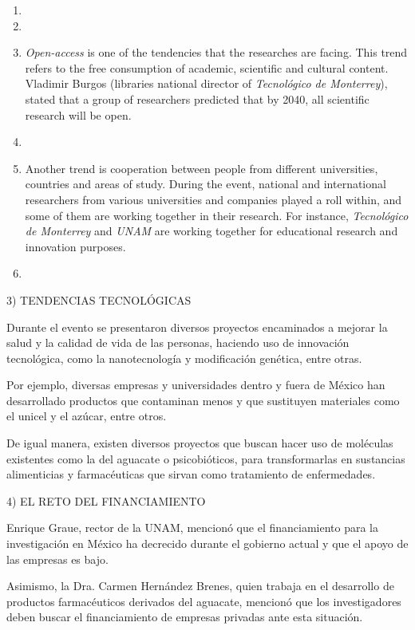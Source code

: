\documentclass[11pt,a4paper]{article}
\begin{document}
\begin{enumerate}
	\item{
		
	}
	\item{
		
	}
	\item{
		\emph{Open-access} is one of the tendencies that the researches are facing. This trend refers to the free consumption of academic, scientific and cultural content. Vladimir Burgos (libraries national director of \emph{Tecnológico de Monterrey}), stated that a group of researchers predicted that by 2040, all scientific research will be open.
	}
	\item{
		
	}
	\item{
		Another trend is cooperation between people from different universities, countries and areas of study. During the event, national and international researchers from various universities and companies played a roll within, and some of them are working together in their research. For instance, \emph{Tecnológico de Monterrey} and \emph{UNAM} are working together for educational research and innovation purposes.
	}
	\item{
		
	}
\end{enumerate}

3) TENDENCIAS TECNOLÓGICAS

 Durante el evento se presentaron diversos proyectos encaminados a mejorar la salud y la calidad de vida de las personas, haciendo uso de innovación tecnológica, como la nanotecnología y modificación genética, entre otras.

Por ejemplo, diversas empresas y universidades dentro y fuera de México han desarrollado productos que contaminan menos y que sustituyen materiales como el unicel y el azúcar, entre otros.

De igual manera, existen diversos proyectos que buscan hacer uso de moléculas existentes como la del aguacate o psicobióticos, para transformarlas en sustancias alimenticias y farmacéuticas que sirvan como tratamiento de enfermedades.


4) EL RETO DEL FINANCIAMIENTO

Enrique Graue, rector de la UNAM, mencionó que el financiamiento para la investigación en México ha decrecido durante el gobierno actual y que el apoyo de las empresas es bajo.

Asimismo, la Dra. Carmen Hernández Brenes, quien trabaja en el desarrollo de productos farmacéuticos derivados del aguacate, mencionó que los investigadores deben buscar el financiamiento de empresas privadas ante esta situación.
\end{document}
